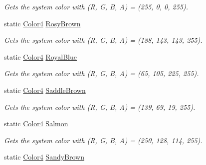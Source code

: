 \begin{DoxyCompactItemize}
\begin{DoxyCompactList}\small\item\em Gets the system color with (R, G, B, A) = (255, 0, 0, 255). \end{DoxyCompactList}\item 
static \hyperlink{struct_open_t_k_1_1_graphics_1_1_color4}{Color4} \hyperlink{struct_open_t_k_1_1_graphics_1_1_color4_a9e54c1a9710e6b60ae70a6556b5ddbf6}{Rosy\-Brown}
\begin{DoxyCompactList}\small\item\em Gets the system color with (R, G, B, A) = (188, 143, 143, 255). \end{DoxyCompactList}\item 
static \hyperlink{struct_open_t_k_1_1_graphics_1_1_color4}{Color4} \hyperlink{struct_open_t_k_1_1_graphics_1_1_color4_a999d1be63fb1025ffb95d4caff23125f}{Royal\-Blue}
\begin{DoxyCompactList}\small\item\em Gets the system color with (R, G, B, A) = (65, 105, 225, 255). \end{DoxyCompactList}\item 
static \hyperlink{struct_open_t_k_1_1_graphics_1_1_color4}{Color4} \hyperlink{struct_open_t_k_1_1_graphics_1_1_color4_a33687f7cc71c2a6f4e2b40cdad224f58}{Saddle\-Brown}
\begin{DoxyCompactList}\small\item\em Gets the system color with (R, G, B, A) = (139, 69, 19, 255). \end{DoxyCompactList}\item 
static \hyperlink{struct_open_t_k_1_1_graphics_1_1_color4}{Color4} \hyperlink{struct_open_t_k_1_1_graphics_1_1_color4_a1bf4bea58618a3839a457cf15c4c5856}{Salmon}
\begin{DoxyCompactList}\small\item\em Gets the system color with (R, G, B, A) = (250, 128, 114, 255). \end{DoxyCompactList}\item 
static \hyperlink{struct_open_t_k_1_1_graphics_1_1_color4}{Color4} \hyperlink{struct_open_t_k_1_1_graphics_1_1_color4_a9d74b6be14388c375a57e2c7af55b016}{Sandy\-Brown}

\end{DoxyCompactItemize}
